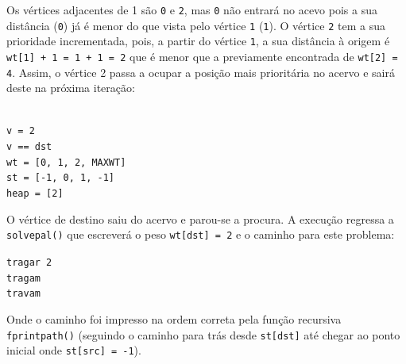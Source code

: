 \documentclass[a4paper, 18pt]{article}
\newcommand\tu[0]{\textunderscore}
\begin{document}
	\par
	Os vértices adjacentes de 1 são \texttt{0} e \texttt{2}, mas \texttt{0} não entrará no acevo pois a sua distância (\texttt{0}) já é menor do que vista pelo vértice \texttt{1} (\texttt{1}). O vértice \texttt{2} tem a sua prioridade incrementada, pois, a partir do vértice \texttt{1}, a sua distância à origem é \texttt{wt[1] + 1 = 1 + 1 = 2} que é menor que a previamente encontrada de \texttt{wt[2] = 4}. Assim, o vértice 2 passa a ocupar a posição mais prioritária no acervo e sairá deste na próxima iteração:
	\begin{center}
		\begin{minipage}{0.45\linewidth}
		\texttt{\\
			v = 2 \\
			v == dst \\
			wt = [0, 1, 2, MAX\tu WT] \\
			st = [-1, 0, 1, -1] \\
			heap = [2] \\}
		\end{minipage}
		\hspace{0.05\linewidth}
	\end{center}
	\par
	O vértice de destino saiu do acervo e parou-se a procura. A execução regressa a \texttt{solve\tu pal()} que escreverá o peso \texttt{wt[dst] = 2} e o caminho para este problema:
	\begin{center}
	\begin{minipage}{0.15\linewidth}
		\texttt{tragar 2 \\
				tragam \\
				travam}
	\end{minipage}
	\end{center}
	\par
	Onde o caminho foi impresso na ordem correta pela função recursiva \texttt{fprint\tu path()} (seguindo o caminho para trás desde \texttt{st[dst]} até chegar ao ponto inicial onde \texttt{st[src] = -1}).

\end{document}
